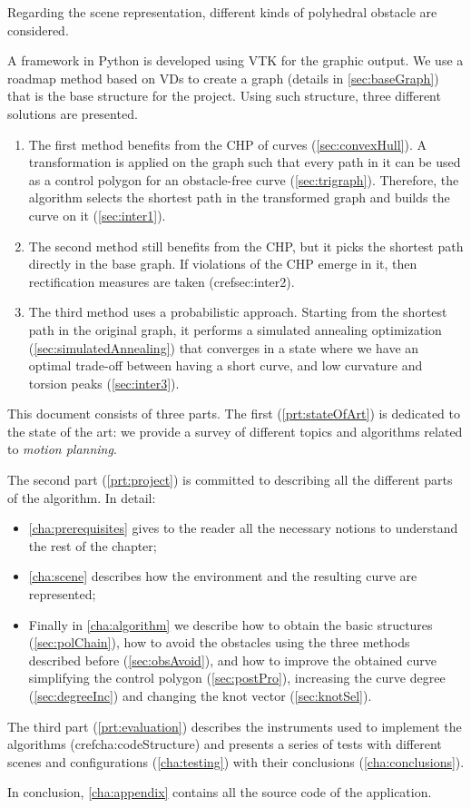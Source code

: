 \documentclass[dissertation.tex]{subfiles}
\begin{document}
Regarding the scene representation, different kinds of
polyhedral obstacle are considered.

A framework in Python is developed using \ac{VTK} for the graphic
output. We use a roadmap method based on \acp{VD} to create a
graph (details in
\cref{sec:baseGraph}) that is the base
structure for the project. Using such structure, three
different solutions are presented.
\begin{enumerate}
\item The first method benefits from the \acf{CHP} of \bs
  curves (\cref{sec:convexHull}). A transformation is applied on the
  graph such that every path in it can be used as a control polygon
  for an obstacle-free curve (\cref{sec:trigraph}). Therefore, the
  algorithm selects the shortest path in the transformed graph and
  builds the curve on it (\cref{sec:inter1}).
\item The second method still benefits from the \ac{CHP},
  but it picks the shortest path directly in the base graph. If
  violations of the \ac{CHP} emerge in it, then rectification
  measures are taken (cref{sec:inter2}).
\item The third method uses a probabilistic approach. Starting from
  the shortest path in the original graph, it performs a simulated
  annealing optimization (\cref{sec:simulatedAnnealing}) that converges
  in a state where we have an optimal trade-off between having a short curve,
  and low curvature and torsion peaks (\cref{sec:inter3}).
\end{enumerate}

This document consists of three parts. The first
(\cref{prt:stateOfArt})
is dedicated to the state of the art: we provide a survey of
different topics and algorithms related to \emph{motion planning}.

The
second part (\cref{prt:project}) is committed to describing
all the different parts of the algorithm. In detail:
\begin{itemize}
\item \cref{cha:prerequisites} gives to the reader all the necessary notions
  to understand the rest of the chapter;
\item \cref{cha:scene} describes how the
  environment and the resulting curve are represented;
\item Finally in
\cref{cha:algorithm} we describe how to obtain the basic structures
(\cref{sec:polChain}), how to avoid the obstacles using the three
methods described before (\cref{sec:obsAvoid}), and how to improve the
obtained curve simplifying the control polygon (\cref{sec:postPro}),
increasing the curve degree (\cref{sec:degreeInc}) and changing the
\bs knot vector (\cref{sec:knotSel}).
\end{itemize}

The third part (\cref{prt:evaluation}) describes the instruments used
to implement the algorithms (cref{cha:codeStructure}) and presents
a series of tests with
different scenes and configurations (\cref{cha:testing}) with their
conclusions (\cref{cha:conclusions}).

In conclusion, \cref{cha:appendix} contains all the source code of the
application.
\end{document}

